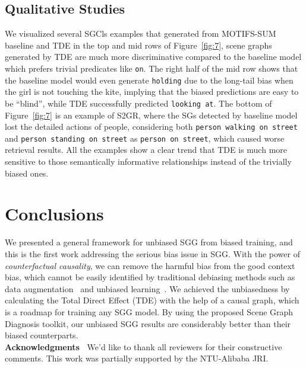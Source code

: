 \documentclass[10pt,twocolumn,letterpaper]{article}
\begin{document}
\subsection{Qualitative Studies}
We visualized several SGCls examples that generated from MOTIFS\textsuperscript{}-SUM baseline and TDE in the top and mid rows of Figure~\ref{fig:7}, scene graphs generated by TDE are much more discriminative compared to the baseline model which prefers trivial predicates like \texttt{on}.  The right half of the mid row shows that the baseline model would even generate \texttt{holding} due to the long-tail bias when the girl is not touching the kite, implying that the biased predictions are easy to be ``blind'', while TDE successfully predicted \texttt{looking at}. The bottom of Figure~\ref{fig:7} is an example of S2GR, where the SGs detected by baseline model lost the detailed actions of people, considering both \texttt{person walking on street} and \texttt{person standing on street} as \texttt{person on street}, which caused worse retrieval results. All the examples show a clear trend that TDE is much more sensitive to those semantically informative relationships instead of the trivially biased ones.

\section{Conclusions}
We presented a general framework for unbiased SGG from biased training, and this is the first work addressing the serious bias issue in SGG. With the power of \emph{counterfactual causality}, we can remove the harmful bias from the good context bias, which cannot be easily identified by traditional debiasing methods such as data augmentation~\cite{geirhos2018imagenettrained, he2009learning} and unbiased learning~\cite{lin2017focal}. We achieved the unbiasedness by calculating the Total Direct Effect (TDE) with the help of a causal graph, which is a roadmap for training any SGG model. By using the proposed Scene Graph Diagnosis toolkit, our unbiased SGG results are considerably better than their biased counterparts.\\
\noindent\textbf{Acknowledgments~}
We'd like to thank all reviewers for their constructive comments. This work was partially supported by the NTU-Alibaba JRI.






 

{\small


}
\end{document}
